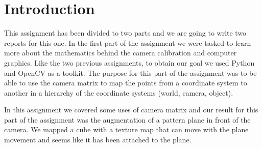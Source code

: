 \pagebreak{}
\section{Introduction}

This assignment has been divided to two parts and we are going to write two reports for this one. In the first part of the assignment we were tasked to learn more about the mathematics behind the camera calibration and computer graphics. Like the two previous assignments, to obtain our goal we used Python and OpenCV as a toolkit. The purpose for this part of the assignment was to be able to use the camera matrix to map the points from a coordinate system to another in a hierarchy of the coordinate systems (world, camera, object).

In this assignment we covered some uses of camera matrix and our result for this part of the assignment was the augmentation of a pattern plane in front of the camera. We mapped a cube with a texture map that can move with the plane movement and seems like it has been attached to the plane.
